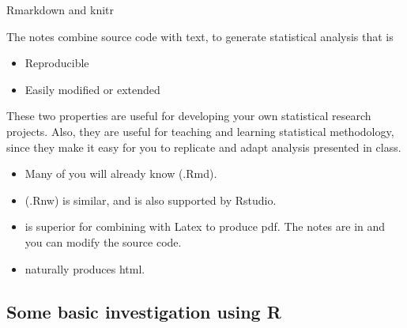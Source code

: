 \begin{frame}{Rmarkdown and knitr}

The notes combine source code with text, to generate statistical analysis that is 
\begin{itemize}
\item Reproducible
\item Easily modified or extended
\end{itemize}
These two properties are useful for developing your own statistical research projects. Also, they are useful for teaching and learning statistical methodology, since they make it easy for you to replicate and adapt analysis presented in class.


\begin{itemize}
\item Many of you will already know  (.Rmd).
\item {} (.Rnw) is similar, and is also supported by Rstudio. 
\item {} is superior for combining with Latex to produce pdf. The notes are in  and you can modify the source code.
\item {} naturally produces html.
\end{itemize}

\end{frame}

\subsection{Some basic investigation using R}

